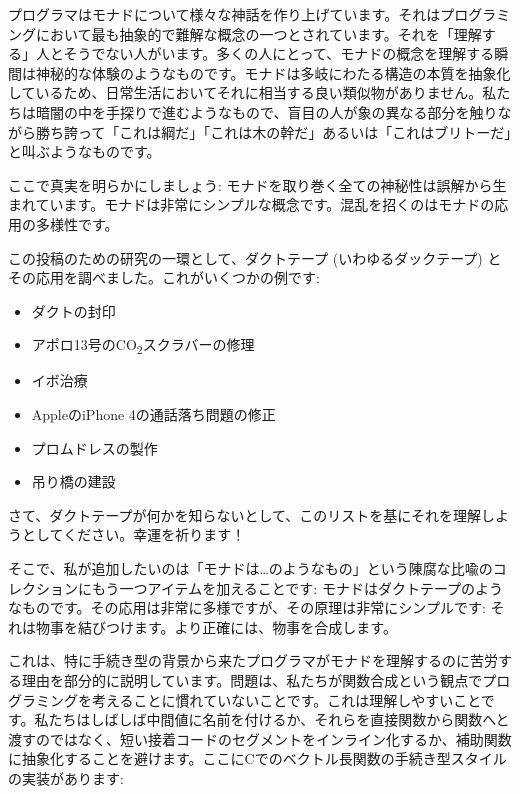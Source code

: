 
\lettrine[lhang=0.17]{プ}{ログラマ}はモナドについて様々な神話を作り上げています。それはプログラミングにおいて最も抽象的で難解な概念の一つとされています。それを「理解する」人とそうでない人がいます。多くの人にとって、モナドの概念を理解する瞬間は神秘的な体験のようなものです。モナドは多岐にわたる構造の本質を抽象化しているため、日常生活においてそれに相当する良い類似物がありません。私たちは暗闇の中を手探りで進むようなもので、盲目の人が象の異なる部分を触りながら勝ち誇って「これは綱だ」「これは木の幹だ」あるいは「これはブリトーだ」と叫ぶようなものです。

ここで真実を明らかにしましょう: モナドを取り巻く全ての神秘性は誤解から生まれています。モナドは非常にシンプルな概念です。混乱を招くのはモナドの応用の多様性です。

この投稿のための研究の一環として、ダクトテープ (いわゆるダックテープ) とその応用を調べました。これがいくつかの例です: 

\begin{itemize}
  \tightlist
  \item
        ダクトの封印
  \item
        アポロ13号のCO\textsubscript{2}スクラバーの修理
  \item
        イボ治療
  \item
        AppleのiPhone 4の通話落ち問題の修正
  \item
        プロムドレスの製作
  \item
        吊り橋の建設
\end{itemize}

\noindent
さて、ダクトテープが何かを知らないとして、このリストを基にそれを理解しようとしてください。幸運を祈ります！

そこで、私が追加したいのは「モナドは\ldots{}のようなもの」という陳腐な比喩のコレクションにもう一つアイテムを加えることです: モナドはダクトテープのようなものです。その応用は非常に多様ですが、その原理は非常にシンプルです: それは物事を結びつけます。より正確には、物事を合成します。

これは、特に手続き型の背景から来たプログラマがモナドを理解するのに苦労する理由を部分的に説明しています。問題は、私たちが関数合成という観点でプログラミングを考えることに慣れていないことです。これは理解しやすいことです。私たちはしばしば中間値に名前を付けるか、それらを直接関数から関数へと渡すのではなく、短い接着コードのセグメントをインライン化するか、補助関数に抽象化することを避けます。ここにCでのベクトル長関数の手続き型スタイルの実装があります: 

